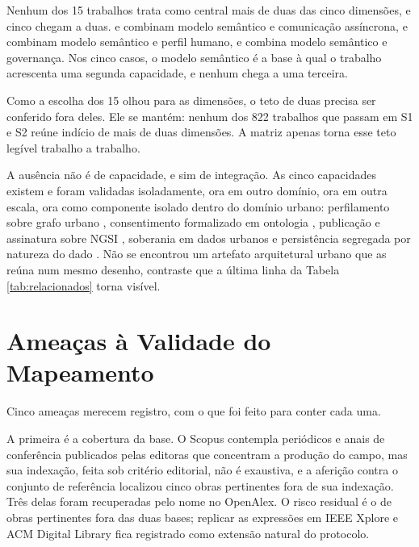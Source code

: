 Nenhum dos 15 trabalhos trata como central mais de duas das cinco dimensões, e cinco chegam a duas.  e  combinam modelo semântico e comunicação assíncrona,  e  combinam modelo semântico e perfil humano, e  combina modelo semântico e governança. Nos cinco casos, o modelo semântico é a base à qual o trabalho acrescenta uma segunda capacidade, e nenhum chega a uma terceira.

Como a escolha dos 15 olhou para as dimensões, o teto de duas precisa ser conferido fora deles. Ele se mantém: nenhum dos 822 trabalhos que passam em S1 e S2 reúne indício de mais de duas dimensões. A matriz apenas torna esse teto legível trabalho a trabalho.

A ausência não é de capacidade, e sim de integração. As cinco capacidades existem e foram validadas isoladamente, ora em outro domínio, ora em outra escala, ora como componente isolado dentro do domínio urbano: perfilamento sobre grafo urbano \cite{liu2023urban,zeng2025knowledge}, consentimento formalizado em ontologia \cite{kurteva2023smashhitcore}, publicação e assinatura sobre NGSI \cite{bouloukakis2023enabling}, soberania em dados urbanos \cite{cuno2019data} e persistência segregada por natureza do dado \cite{souza2018geographic}. Não se encontrou um artefato arquitetural urbano que as reúna num mesmo desenho, contraste que a última linha da Tabela \ref{tab:relacionados} torna visível.

\section{Ameaças à Validade do Mapeamento}
\label{sec:ameacas-msl}

Cinco ameaças merecem registro, com o que foi feito para conter cada uma.

A primeira é a cobertura da base. O Scopus contempla periódicos e anais de conferência publicados pelas editoras que concentram a produção do campo, mas sua indexação, feita sob critério editorial, não é exaustiva, e a aferição contra o conjunto de referência localizou cinco obras pertinentes fora de sua indexação. Três delas foram recuperadas pelo nome no OpenAlex. O risco residual é o de obras pertinentes fora das duas bases; replicar as expressões em IEEE Xplore e ACM Digital Library fica registrado como extensão natural do protocolo.


